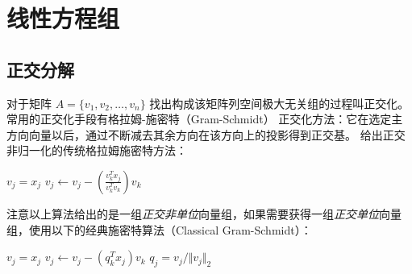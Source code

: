 \chapter[short]{线性方程组}

\section{正交分解}
对于矩阵 $A=\{v_1,v_2,\dots,v_n\}$ 找出构成该矩阵列空间极大无关组的过程叫正交化。常用的正交化手段有格拉姆-施密特（Gram-Schmidt）
正交化方法：它在选定主方向向量以后，通过不断减去其余方向在该方向上的投影得到正交基。
给出正交非归一化的传统格拉姆施密特方法：
\begin{center}
    \begin{minipage}{.7\linewidth}
        \begin{algorithm}[H]
            \caption{}
            {
                $v_j=x_j$\;
                {
                    $v_j\leftarrow v_j-(\frac{v_k^Tx_j}{v_k^Tv_k})v_k$\;
                }
            }
        \end{algorithm}
    \end{minipage}
\end{center}
注意以上算法给出的是一组\emph{正交非单位}向量组，如果需要获得一组\emph{正交单位}向量组，使用以下的经典施密特算法（Classical Gram-Schmidt）：
\begin{center}
    \begin{minipage}{.7\linewidth}
        \begin{algorithm}[H]
            \caption{}
            {
                $v_j=x_j$\;
                {
                    $v_j\leftarrow v_j-(q_k^Tx_j)v_k$\;
                }
                $q_j=v_j/\Vert v_j\Vert_2$\;
            }
        \end{algorithm}
    \end{minipage}
\end{center}

